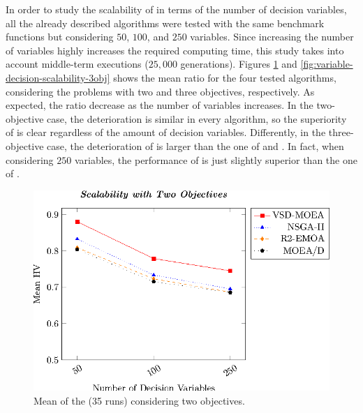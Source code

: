 In order to study the scalability of \VSDMOEA{} in terms of the number of decision variables, all the already described algorithms were tested with
the same benchmark functions but considering $50$, $100$, and $250$ variables.
%
Since increasing the number of variables highly increases the required computing time, this study takes into account middle-term executions ($25,000$ generations).
%
Figures \ref{fig:variable-decision-scalability-2obj} and \ref{fig:variable-decision-scalability-3obj} shows the mean \HV{} ratio for the four tested algorithms,
considering the problems with two and three objectives, respectively.
%
As expected, the \HV{} ratio decrease as the number of variables increases.
%
In the two-objective case, the deterioration is similar in every algorithm, so the superiority of \VSDMOEA{} is clear regardless of the amount of decision
variables.
%
Differently, in the three-objective case, the deterioration of \VSDMOEA{} is larger than the one of \RMOEA{} and \MOEAD{}.
%
In fact, when considering $250$ variables, the performance of \VSDMOEA{} is just slightly superior than the one of \RMOEA{}.


%
%
%


\begin{figure}[t]
\centering
\includegraphics[]{Images/Graphic-Scalability-2obj_tikz-figure0.eps}
%
\caption{Mean of the \HV{} (35 runs) considering two objectives.}\label{fig:variable-decision-scalability-2obj}
\end{figure}

